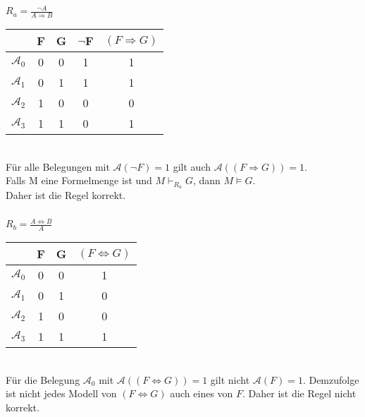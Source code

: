\documentclass[10pt,a4paper,oneside,ngerman,numbers=noenddot]{scrartcl}
\begin{document}
\subsubsection{} %
$R_{a} = \frac{\neg A}{A \Rightarrow B}$\\
\begin{tabular}{c|cc|cc}
 & F & G & $\neg$F & $(F \Rightarrow G)$ \\
 \hline
$\mathcal{A}_{0}$ & 0 & 0 & 1 & 1 \\
$\mathcal{A}_{1}$ & 0 & 1 & 1 & 1 \\
$\mathcal{A}_{2}$ & 1 & 0 & 0 & 0 \\
$\mathcal{A}_{3}$ & 1 & 1 & 0 & 1
\end{tabular}\\
Für alle Belegungen mit $\mathcal{A}(\neg F) = 1$ gilt auch $\mathcal{A}((F \Rightarrow G)) = 1$.\\
Falls M eine Formelmenge ist und $M \vdash_{R_{a}} G$, dann $M \models G$. \\
Daher ist die Regel korrekt.
\subsubsection{} %
$R_{b} = \frac{A \Leftrightarrow B}{A}$\\
\begin{tabular}{c|cc|c}
 & F & G & $(F \Leftrightarrow G)$ \\
 \hline
$\mathcal{A}_{0}$ & 0 & 0 & 1 \\
$\mathcal{A}_{1}$ & 0 & 1 & 0 \\
$\mathcal{A}_{2}$ & 1 & 0 & 0 \\
$\mathcal{A}_{3}$ & 1 & 1 & 1
\end{tabular}\\
Für die Belegung $\mathcal{A}_{0}$ mit $\mathcal{A}((F \Leftrightarrow G)) = 1$ gilt nicht $\mathcal{A}(F) = 1$. Demzufolge ist nicht jedes Modell von $(F \Leftrightarrow G)$ auch eines von $F$. Daher ist die Regel nicht korrekt.
\end{document}
